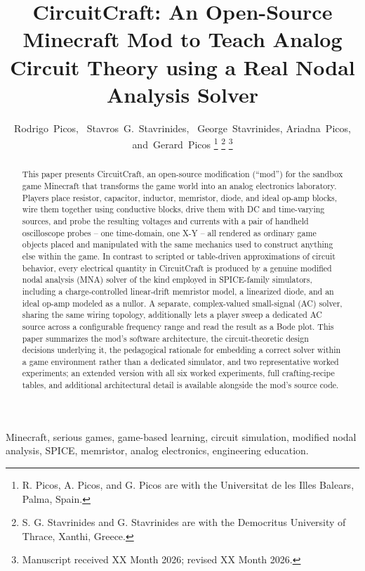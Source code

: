 \documentclass[journal]{IEEEtran}
\title{CircuitCraft: An Open-Source Minecraft Mod to Teach Analog Circuit Theory using a Real Nodal Analysis Solver}
\author{Rodrigo~Picos,~\IEEEmembership{Senior~Member,~IEEE,}
        Stavros~G.~Stavrinides,~\IEEEmembership{Senior~Member,~IEEE,}
        George~Stavrinides, Ariadna~Picos, and~Gerard~Picos%
\thanks{R. Picos, A. Picos, and G. Picos are with the Universitat de les Illes Balears, Palma, Spain.}%
\thanks{S. G. Stavrinides and G. Stavrinides are with the Democritus University of Thrace, Xanthi, Greece.}%
\thanks{Manuscript received XX Month 2026; revised XX Month 2026.}}
\begin{document}
\maketitle

\begin{abstract}
This paper presents CircuitCraft, an open-source modification (``mod'') for the sandbox
game Minecraft that transforms the game world into an analog electronics laboratory. Players
place resistor, capacitor, inductor, memristor, diode, and ideal op-amp blocks, wire them
together using conductive blocks, drive them with DC and time-varying sources, and probe the
resulting voltages and currents with a pair of handheld oscilloscope probes -- one
time-domain, one X-Y -- all rendered as ordinary game objects placed and manipulated with the
same mechanics used to construct anything else within the game. In contrast to scripted or
table-driven approximations of circuit behavior, every electrical quantity in CircuitCraft
is produced by a genuine modified nodal analysis (MNA) solver of the kind
employed in SPICE-family simulators, including a charge-controlled linear-drift memristor
model, a linearized diode, and an ideal op-amp modeled as a nullor. A separate, complex-valued
small-signal (AC) solver, sharing the same wiring topology, additionally lets a player sweep a
dedicated AC source across a configurable frequency range and read the result as a Bode plot.
This paper summarizes the mod's software architecture, the circuit-theoretic design decisions
underlying it, the pedagogical rationale for embedding a correct solver within a game
environment rather than a dedicated simulator, and two representative worked experiments; an
extended version with all six worked experiments, full crafting-recipe tables, and additional
architectural detail is available alongside the mod's source code.
\end{abstract}

\begin{IEEEkeywords}
Minecraft, serious games, game-based learning, circuit simulation, modified nodal analysis,
SPICE, memristor, analog electronics, engineering education.
\end{IEEEkeywords}

\IEEEpeerreviewmaketitle
















\end{document}
